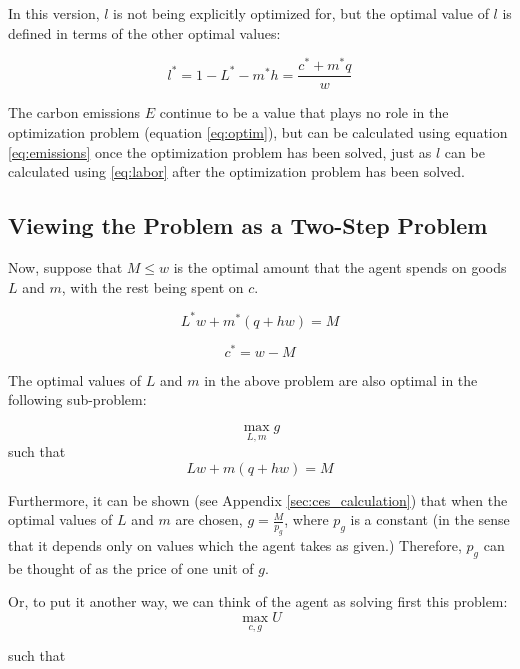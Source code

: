 \documentclass[letter, 12pt, epsf,leqno]{article}
\begin{document}
In this version, $l$ is not being explicitly optimized for, but the optimal value of $l$ is defined in terms of the other optimal values:

\begin{equation}l^*=1-L^*-m^*h=\frac{c^*+m^*q}{w}\label{eq:labor}\end{equation}

The carbon emissions $E$ continue to be a value that plays no role in the optimization problem (equation \ref{eq:optim}), but can be calculated using equation \ref{eq:emissions} once the optimization problem has been solved, just as $l$ can be calculated using \ref{eq:labor} after the optimization problem has been solved.

\subsection{Viewing the Problem as a Two-Step Problem}

Now, suppose that $M \le w$ is the optimal amount that the agent spends on goods $L$ and $m$, with the rest being spent on $c$.

\begin{equation}L^*w+ m^*(q+hw)=M\end{equation}

\begin{equation}c^*=w-M\end{equation}

The optimal values of $L$ and $m$ in the above problem are also optimal in the following sub-problem:

\begin{equation}\max_{L, m} g\end{equation}
such that
\begin{equation}Lw+ m(q+hw)=M\end{equation}

Furthermore, it can be shown (see Appendix \ref{sec:ces_calculation})  that when the optimal values of $L$ and $m$ are chosen, $g=\frac{M}{p_g}$, where $p_g$ is a constant (in the sense that it depends only on values which the agent takes as given.)  Therefore, $p_g$ can be thought of as the price of one unit of $g$.

Or, to put it another way, we can think of the agent as solving first this problem:
\begin{equation}\max_{c, g} U\end{equation}

such that
\end{document}
